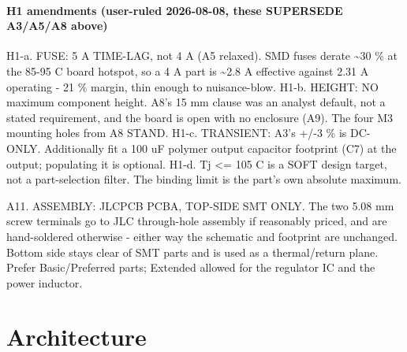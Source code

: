 \documentclass[11pt,a4paper]{article}
\begin{document}
\paragraph*{H1 amendments (user-ruled 2026-08-08, these SUPERSEDE A3/A5/A8 above)}
H1-a. FUSE: 5 A TIME-LAG, not 4 A (A5 relaxed). SMD fuses derate \textasciitilde{}30 \% at the 85-95 C board hotspot, so a 4 A part is \textasciitilde{}2.8 A effective against 2.31 A operating - 21 \% margin, thin enough to nuisance-blow. H1-b. HEIGHT: NO maximum component height. A8's 15 mm clause was an analyst default, not a stated requirement, and the board is open with no enclosure (A9). The four M3 mounting holes from A8 STAND. H1-c. TRANSIENT: A3's +/-3 \% is DC-ONLY. Additionally fit a 100 uF polymer output capacitor footprint (C7) at the output; populating it is optional. H1-d. Tj \textless{}= 105 C is a SOFT design target, not a part-selection filter. The binding limit is the part's own absolute maximum.

A11. ASSEMBLY: JLCPCB PCBA, TOP-SIDE SMT ONLY. The two 5.08 mm screw terminals go to JLC through-hole assembly if reasonably priced, and are hand-soldered otherwise - either way the schematic and footprint are unchanged. Bottom side stays clear of SMT parts and is used as a thermal/return plane. Prefer Basic/Preferred parts; Extended allowed for the regulator IC and the power inductor.

\section{Architecture}
\end{document}
